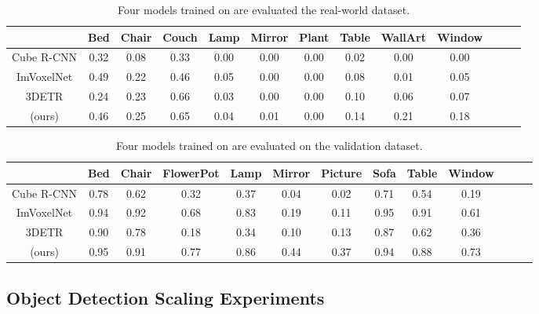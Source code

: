 \begin{table}[]
    \centering
    \begin{tabular}{c| c|c|c|c| c|c|c|c| c|c|c|c|}
     &  Bed & Chair & Couch & Lamp & Mirror & Plant & Table & WallArt & Window \\ \hline
        Cube R-CNN    & 0.32 & 0.08 & 0.33 & 0.00 & 0.00 & 0.00 & 0.02 & 0.00 & 0.00 \\ 
        ImVoxelNet    & 0.49 & 0.22 & 0.46 & 0.05 & 0.00 & 0.00 & 0.08 & 0.01 & 0.05 \\ 
        3DETR         & 0.24 & 0.23 & 0.66 & 0.03 & 0.00 & 0.00 & 0.10 & 0.06 & 0.07 \\
        \EVL{} (ours) & 0.46 & 0.25 & 0.65 & 0.04 & 0.01 & 0.00 & 0.14 & 0.21 & 0.18 \\  %
    \end{tabular}
    \caption{Four models trained on \ASE{} are evaluated the real-world \AOThree{} dataset. }
    \label{tab:obj_det_per_class_aeo}
\end{table}


\begin{table}[]
    \centering
    \begin{tabular}{c| c|c|c|c| c|c|c|c| c|c|c|c|}
     &  Bed & Chair & FlowerPot & Lamp & Mirror & Picture & Sofa & Table & Window \\ \hline
        Cube R-CNN    & 0.78 & 0.62 & 0.32 & 0.37 & 0.04 & 0.02 & 0.71 & 0.54 & 0.19 \\ 
        ImVoxelNet    & 0.94 & 0.92 & 0.68 & 0.83 & 0.19 & 0.11 & 0.95 & 0.91 & 0.61 \\ 
        3DETR         & 0.90 & 0.78 & 0.18 & 0.34 & 0.10 & 0.13 & 0.87 & 0.62 & 0.36 \\
        \EVL{} (ours) & 0.95 & 0.91 & 0.77 & 0.86 & 0.44 & 0.37 & 0.94 & 0.88 & 0.73 \\  %
    \end{tabular}
    \caption{Four models trained on \ASE{} are evaluated on the \ASE{} validation dataset. }
    \label{tab:obj_det_per_class_ase}
\end{table}



\subsection{\EVL{} Object Detection Scaling Experiments}
\label{sup:scaling}

